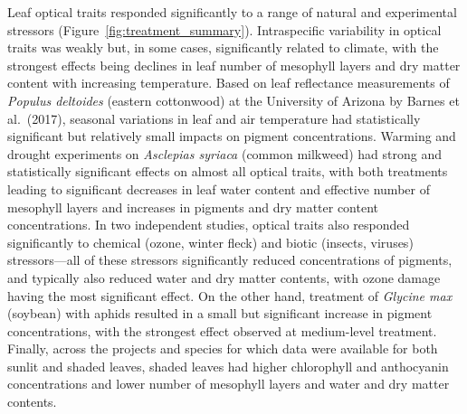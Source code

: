 Leaf optical traits responded significantly to a range of natural and experimental stressors (Figure~\ref{fig:treatment_summary}).
Intraspecific variability in optical traits was weakly but, in some cases, significantly related to climate, with the strongest effects being declines in leaf number of mesophyll layers and dry matter content with increasing temperature.
% 
% 
Based on leaf reflectance measurements of \textit{Populus deltoides} (eastern cottonwood) at the University of Arizona by Barnes et al.~(2017), \nocite{barnes_2017_beyond}
% 
% 
seasonal variations in leaf and air temperature had statistically significant but relatively small impacts on pigment concentrations.
Warming and drought experiments on \textit{Asclepias syriaca} (common milkweed) had strong and statistically significant effects on almost all optical traits, with both treatments leading to significant decreases in leaf water content and effective number of mesophyll layers and increases in pigments and dry matter content concentrations.
% 
% 
In two independent studies, optical traits also responded significantly to chemical (ozone, winter fleck) and biotic (insects, viruses) stressors---all of these stressors significantly reduced concentrations of pigments, and typically also reduced water and dry matter contents, with ozone damage having the most significant effect.
% 
% 
% 
%
% 
% 
On the other hand, treatment of \textit{Glycine max} (soybean) with aphids resulted in a small but significant increase in pigment concentrations, with the strongest effect observed at medium-level treatment.
Finally, across the projects and species for which data were available for both sunlit and shaded leaves, shaded leaves had higher chlorophyll and anthocyanin concentrations and lower number of mesophyll layers and water and dry matter contents.
% 
% 

